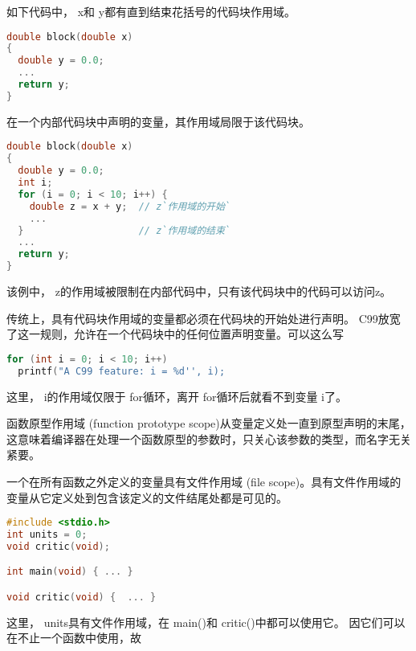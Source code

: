 \begin{frame}[fragile]
  如下代码中，{ x}和{ y}都有直到结束花括号的代码块作用域。
  \begin{lstlisting}[language=c,frame=single]
double block(double x)
{
  double y = 0.0;
  ...
  return y;
}    
  \end{lstlisting}
\end{frame}

\begin{frame}[fragile]
在一个内部代码块中声明的变量，其作用域局限于该代码块。
\end{frame}

\begin{frame}[fragile]
  \begin{lstlisting}[language=c,frame=single]
double block(double x)
{
  double y = 0.0;
  int i;
  for (i = 0; i < 10; i++) {
    double z = x + y;  // z`作用域的开始`
    ...    
  }                    // z`作用域的结束`
  ...
  return y;
}    
  \end{lstlisting}
  该例中，{ z}的作用域被限制在内部代码中，只有该代码块中的代码可以访问z。
\end{frame}

\begin{frame}[fragile]
  传统上，具有代码块作用域的变量都必须在代码块的开始处进行声明。{ C99}放宽了这一规则，允许在一个代码块中的任何位置声明变量。可以这么写
  \begin{lstlisting}[language=c,frame=single]
for (int i = 0; i < 10; i++)
  printf("A C99 feature: i = %d'', i);
  \end{lstlisting}
  这里，{ i}的作用域仅限于{ for}循环，离开{ for}循环后就看不到变量{ i}了。
\end{frame}

\begin{frame}[fragile]
  函数原型作用域{ (function prototype scope)}从变量定义处一直到原型声明的末尾，这意味着编译器在处理一个函数原型的参数时，只关心该参数的类型，而名字无关紧要。
\end{frame}

\begin{frame}[fragile]
  一个在所有函数之外定义的变量具有文件作用域{ (file scope)}。具有文件作用域的变量从它定义处到包含该定义的文件结尾处都是可见的。
\end{frame}

\begin{frame}[fragile]
  \begin{lstlisting}[language=c,frame=single]
#include <stdio.h>
int units = 0;
void critic(void);

int main(void) { ... }

void critic(void) {  ... }    
  \end{lstlisting}
这里，{ units}具有文件作用域，在{ main()}和{ critic()}中都可以使用它。
因它们可以在不止一个函数中使用，故
\end{frame}


